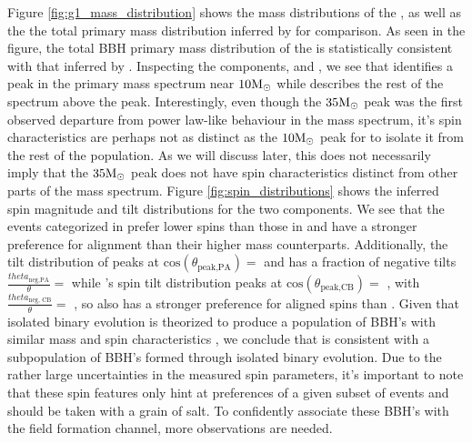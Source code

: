 
Figure \ref{fig:g1_mass_distribution} shows the mass distributions of the \base{}, as well as the the total primary mass distribution inferred by \brucepaper{} for comparison. As seen in the figure, the total BBH primary mass distribution of the \base{} is statistically consistent with that inferred by \brucepaper{}. Inspecting the components, \first{} and \contB{}, we see that \first{} identifies a peak in the primary mass spectrum near $10{\rm M}_\odot$ while \contB{} describes the rest of the spectrum above the peak. Interestingly, even though the $35{\rm M}_\odot$ peak was the first observed departure from power law-like behaviour in the mass spectrum, it's spin characteristics are perhaps not as distinct as the $10{\rm M}_\odot$ peak for \first{} to isolate it from the rest of the population. As we will discuss later, this does not necessarily imply that the $35{\rm M}_\odot$ peak does not have spin characteristics distinct from other parts of the mass spectrum. Figure \ref{fig:spin_distributions} shows the inferred spin magnitude and tilt distributions for the two components. We see that the events categorized in \first{} prefer lower spins than those in \contB{} and have a stronger preference for alignment than their higher mass counterparts. Additionally, the tilt distribution of \first{} peaks at $\text{cos}(\theta_\text{peak,PA})=$ \result{$\CIPlusMinus{\macros[CosTilt][Base][PeakA][max]}$} and has a fraction of negative tilts $\frac{theta_\text{neg,PA}}{\theta}=$ \result{$\CIPlusMinus{\macros[CosTilt][Base][PeakA][negfrac]}$} while \contB{}'s spin tilt distribution peaks at $\text{cos}(\theta_\text{peak,CB})=$ \result{$\CIPlusMinus{\macros[CosTilt][Base][ContinuumB][max]}$}, with $\frac{theta_\text{neg, CB}}{\theta} = $ \result{$\CIPlusMinus{\macros[CosTilt][Base][ContinuumB][negfrac]}$}, so \first{} also has a stronger preference for aligned spins than \contB{}. Given that isolated binary evolution is theorized to produce a population of BBH's with similar mass and spin characteristics , we conclude that \first{} is consistent with a subpopulation of BBH's formed through isolated binary evolution. Due to the rather large uncertainties in the measured spin parameters, it's important to note that these spin features only hint at preferences of a given subset of events and should be taken with a grain of salt. To confidently associate these BBH's with the field formation channel, more observations are needed. 

